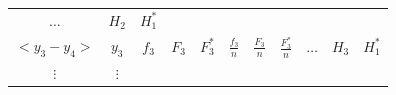 \documentclass[10pt,]{krantz}
\theoremstyle{definition}
\theoremstyle{definition}
\theoremstyle{definition}
\theoremstyle{definition}
\theoremstyle{remark}
\begin{document}
\begin{longtable}[]{@{}cccccccccll@{}}
\begin{minipage}[t]{0.05\columnwidth}
\(\ldots\)\strut
\end{minipage} & \begin{minipage}[t]{0.05\columnwidth}\raggedright
\(H_2\)\strut
\end{minipage} & \begin{minipage}[t]{0.05\columnwidth}\raggedright
\(H_1^*\)\strut
\end{minipage}\tabularnewline
\begin{minipage}[t]{0.09\columnwidth}\centering
\(<y_3-y_4>\)\strut
\end{minipage} & \begin{minipage}[t]{0.05\columnwidth}\centering
\(y_3\)\strut
\end{minipage} & \begin{minipage}[t]{0.05\columnwidth}\centering
\(f_3\)\strut
\end{minipage} & \begin{minipage}[t]{0.05\columnwidth}\centering
\(F_3\)\strut
\end{minipage} & \begin{minipage}[t]{0.05\columnwidth}\centering
\(F_3^*\)\strut
\end{minipage} & \begin{minipage}[t]{0.09\columnwidth}\centering
\(\frac{f_3}{n}\)\strut
\end{minipage} & \begin{minipage}[t]{0.09\columnwidth}\centering
\(\frac{F_3}{n}\)\strut
\end{minipage} & \begin{minipage}[t]{0.10\columnwidth}\centering
\(\frac{F_3^*}{n}\)\strut
\end{minipage} & \begin{minipage}[t]{0.05\columnwidth}\centering
\(\ldots\)\strut
\end{minipage} & \begin{minipage}[t]{0.05\columnwidth}\raggedright
\(H_3\)\strut
\end{minipage} & \begin{minipage}[t]{0.05\columnwidth}\raggedright
\(H_1^*\)\strut
\end{minipage}\tabularnewline
\begin{minipage}[t]{0.09\columnwidth}\centering
\(\vdots\)\strut
\end{minipage} & \begin{minipage}[t]{0.05\columnwidth}\centering
\(\vdots\)\strut
\end{minipage} & \begin{minipage}[t]{0.05\columnwidth}\centering

\end{minipage}
\end{longtable}
\end{document}
